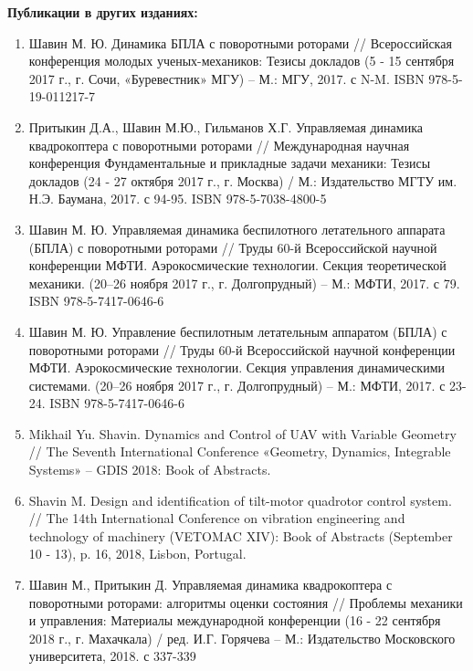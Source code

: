 \textbf{Публикации в других изданиях:}
\begin{enumerate}
	\item Шавин М. Ю. Динамика БПЛА с поворотными роторами // Всероссийская конференция молодых ученых-механиков: Тезисы докладов (5 - 15 сентября 2017 г., г. Сочи, «Буревестник» МГУ)  – М.: МГУ, 2017. с N-M. ISBN 978-5-19-011217-7
	
	\item Притыкин Д.А., Шавин М.Ю., Гильманов Х.Г. Управляемая динамика квадрокоптера с поворотными роторами // Международная научная конференция Фундаментальные и прикладные задачи механики: Тезисы докладов (24 - 27 октября 2017 г., г. Москва) / М.: Издательство МГТУ им. Н.Э. Баумана, 2017. с 94-95.
	ISBN 978-5-7038-4800-5
	
	\item Шавин М. Ю. Управляемая динамика беспилотного летательного аппарата (БПЛА) с поворотными роторами // Труды 60-й Всероссийской научной конференции МФТИ. Аэрокосмические технологии. Секция теоретической механики. (20–26 ноября 2017 г., г. Долгопрудный) -- М.: МФТИ, 2017. с 79. ISBN 978-5-7417-0646-6
	
	\item Шавин М. Ю. Управление беспилотным летательным аппаратом (БПЛА) с поворотными роторами // Труды 60-й Всероссийской научной конференции МФТИ. Аэрокосмические технологии. Секция управления динамическими системами. (20–26 ноября 2017 г., г. Долгопрудный) -- М.: МФТИ, 2017. с 23-24. ISBN 978-5-7417-0646-6
	
	\item Mikhail Yu. Shavin. Dynamics and Control of UAV with Variable Geometry // The Seventh International Conference «Geometry, Dynamics, Integrable Systems» – GDIS 2018: Book of Abstracts.
	
	\item Shavin M. Design and identification of tilt-motor quadrotor control system. // The 14th International Conference on vibration engineering and technology of machinery (VETOMAC XIV): Book of Abstracts (September 10 - 13), p. 16, 2018, Lisbon, Portugal.
	
	\item Шавин М., Притыкин Д. Управляемая динамика квадрокоптера с поворотными роторами: алгоритмы оценки состояния // Проблемы механики и управления: Материалы международной конференции (16 - 22 сентября 2018 г., г. Махачкала) / ред. И.Г. Горячева – М.: Издательство Московского университета, 2018. с 337-339
	
\end{enumerate}